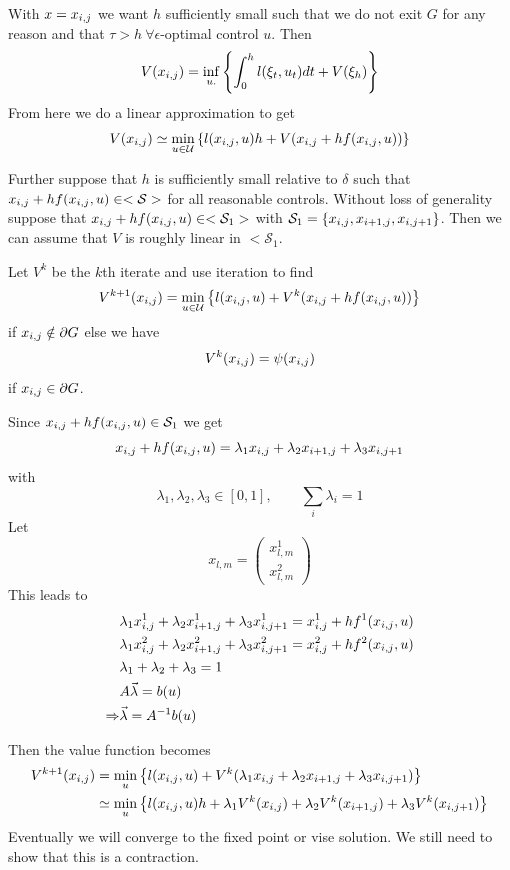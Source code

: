With $x=x_{i,j}$ we want $h$ sufficiently small such that we do not exit $G$ for any reason and that $\tau>h~\forall \epsilon$-optimal control $u$.
Then
$$V(x_{i,j}) = \inf_{u.}\left\lbrace \int_0^h l(\xi_t,u_t)dt + V(\xi_h) \right\rbrace$$
From here we do a linear approximation to get
$$V(x_{i,j}) \simeq \min_{u\in\mathcal{U}}\left\lbrace l(x_{i,j},u)h + V(x_{i,j} + hf(x_{i,j},u)) \right\rbrace$$

Further suppose that $h$ is sufficiently small relative to $\delta$ such that $x_{i,j}+hf(x_{i,j},u)\in<\mathcal{S}>$ for all reasonable controls.
Without loss of generality suppose that $x_{i,j}+hf(x_{i,j},u)\in<\mathcal{S}_1>$ with $\mathcal{S}_1=\{x_{i,j},x_{i+1,j},x_{i,j+1}\}$.
Then we can assume that $V$ is roughly linear in $<\mathcal{S}_1$.

Let $V^k$ be the $k$th iterate and use iteration to find
$$V^{k+1}(x_{i,j}) = \min_{u\in\mathcal{U}}\left\lbrace l(x_{i,j},u) + V^k(x_{i,j}+hf(x_{i,j},u))\right\rbrace$$
if $x_{i,j}\notin\partial G$ else we have
$$V^k(x_{i,j})=\psi(x_{i,j})$$
if $x_{i,j}\in\partial G$.

Since $x_{i,j}+hf(x_{i,j},u)\in\mathcal{S}_1$ we get
$$x_{i,j}+hf(x_{i,j},u) = \lambda_1x_{i,j} + \lambda_2x_{i+1,j} + \lambda_3x_{i,j+1}$$
with
$$\lambda_1,\lambda_2,\lambda_3\in[0,1], \qquad \sum_i\lambda_i=1$$
Let
$$x_{l,m} = \left(\begin{array}{c} x_{l,m}^1 \\ x_{l,m}^2 \end{array}\right)$$
This leads to
\begin{align*}
&\lambda_1x_{i,j}^1 + \lambda_2x_{i+1,j}^1 + \lambda_3x_{i,j+1}^1 = x_{i,j}^1+hf^1(x_{i,j},u) \\
&\lambda_1x_{i,j}^2 + \lambda_2x_{i+1,j}^2 + \lambda_3x_{i,j+1}^2 = x_{i,j}^2+hf^2(x_{i,j},u) \\
&\lambda_1 + \lambda_2 + \lambda_3 = 1 \\
&A\vec{\lambda} = b(u) \\
\Rightarrow &\vec{\lambda} = A^{-1}b(u)
\end{align*}

Then the value function becomes
\begin{align}
\label{eq:17val}
V^{k+1}(x_{i,j}) &= \min_u\left\lbrace l(x_{i,j},u) + V^k(\lambda_1x_{i,j} + \lambda_2x_{i+1,j} + \lambda_3x_{i,j+1}) \right\rbrace \nonumber \\
&\simeq \min_u\left\lbrace l(x_{i,j},u)h + \lambda_1V^k(x_{i,j}) + \lambda_2V^k(x_{i+1,j}) + \lambda_3V^k(x_{i,j+1}) \right\rbrace
\end{align}
Eventually we will converge to the fixed point or vise solution.
We still need to show that this is a contraction.

